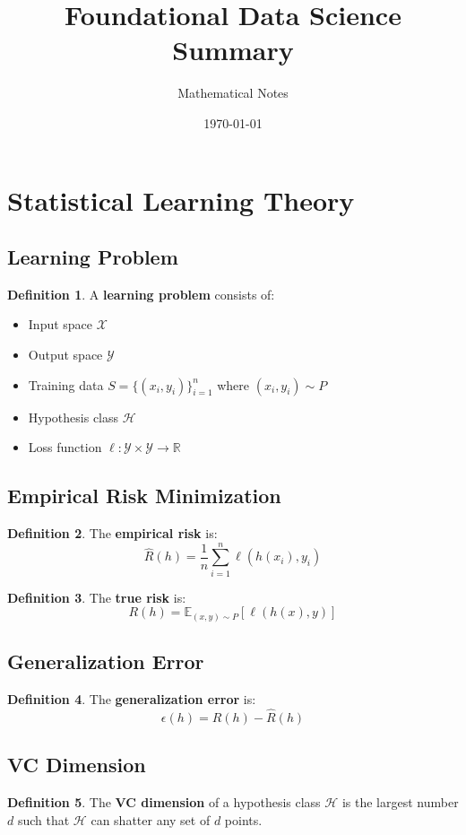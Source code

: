 \documentclass[11pt]{article}
\title{Foundational Data Science Summary}
\author{Mathematical Notes}
\date{\today}
\theoremstyle{definition}
\newtheorem{definition}{Definition}[section]
\begin{document}
\maketitle

\tableofcontents
\newpage

\section{Statistical Learning Theory}

\subsection{Learning Problem}
\begin{definition}
A \textbf{learning problem} consists of:
\begin{itemize}
    \item Input space $\mathcal{X}$
    \item Output space $\mathcal{Y}$
    \item Training data $S = \{(x_i, y_i)\}_{i=1}^n$ where $(x_i, y_i) \sim P$
    \item Hypothesis class $\mathcal{H}$
    \item Loss function $\ell: \mathcal{Y} \times \mathcal{Y} \to \mathbb{R}$
\end{itemize}
\end{definition}

\subsection{Empirical Risk Minimization}
\begin{definition}
The \textbf{empirical risk} is:
$$\hat{R}(h) = \frac{1}{n} \sum_{i=1}^n \ell(h(x_i), y_i)$$
\end{definition}

\begin{definition}
The \textbf{true risk} is:
$$R(h) = \mathbb{E}_{(x,y) \sim P}[\ell(h(x), y)]$$
\end{definition}

\subsection{Generalization Error}
\begin{definition}
The \textbf{generalization error} is:
$$\epsilon(h) = R(h) - \hat{R}(h)$$
\end{definition}

\subsection{VC Dimension}
\begin{definition}
The \textbf{VC dimension} of a hypothesis class $\mathcal{H}$ is the largest number $d$ such that $\mathcal{H}$ can shatter any set of $d$ points.
\end{definition}
\end{document}
